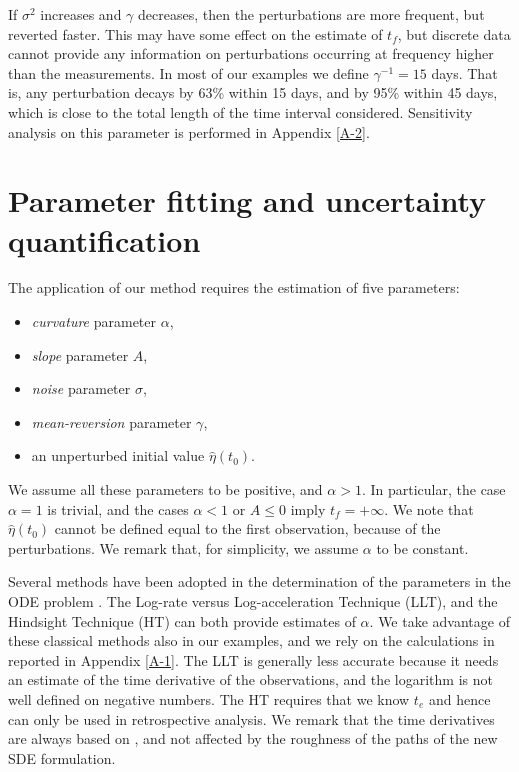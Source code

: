 \documentclass{article}
\begin{document}
If $\sigma^2$ increases and $\gamma$ decreases, then the perturbations are more frequent, but reverted faster. This may have some effect on the estimate of $t_f$, but discrete data cannot provide any information on perturbations occurring at frequency higher than the measurements. In most of our examples we define $\gamma^{-1}=15$ days. That is, any perturbation decays by 63\% within 15 days, and by 95\% within 45 days, which is close to the total length of the time interval considered. Sensitivity analysis on this parameter is performed in Appendix \ref{A-2}.

\section{Parameter fitting and uncertainty quantification}\label{s4}
The application of our method requires the estimation of five parameters:
\begin{itemize}
  \item {\it curvature} parameter $\alpha$,
  \item {\it slope} parameter $A$,
  \item {\it noise} parameter $\sigma$,
  \item {\it mean-reversion} parameter $\gamma$,
  \item an unperturbed initial value $\hat\eta(t_0)$.
\end{itemize}
We assume all these parameters to be positive, and $\alpha > 1$. In particular, the case $\alpha=1$ is trivial, and the cases $\alpha <1$ or $A\le0$ imply $t_f=+\infty$. We note that $\hat\eta(t_0)$ cannot be defined equal to the first observation, because of the perturbations. We remark that, for simplicity, we assume $\alpha$ to be constant.

Several methods have been adopted in the determination of the parameters in the ODE problem \citep{Cornelius1995}. The Log-rate versus Log-acceleration Technique (LLT), and the Hindsight Technique (HT) can both provide estimates of $\alpha$. We take advantage of these classical methods also in our examples, and we rely on the calculations in \cite{Voight1988} reported in Appendix \ref{A-1}. The LLT is generally less accurate because it needs an estimate of the time derivative of the observations, and the logarithm is not well defined on negative numbers. The HT requires that we know $t_e$ and hence can only be used in retrospective analysis. We remark that the time derivatives are always based on \cite{Voight1988}, and not affected by the roughness of the paths of the new SDE formulation.
\end{document}
